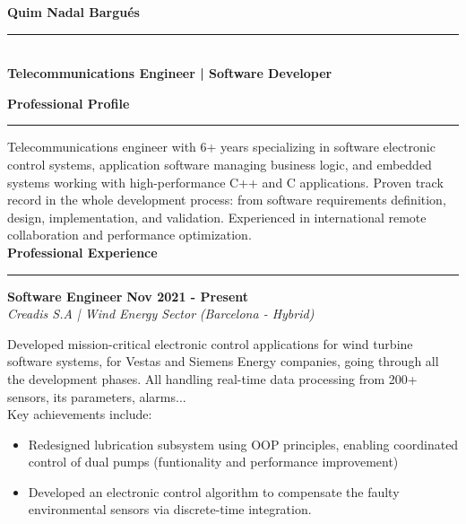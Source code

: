\documentclass[11pt,a4paper]{article}
\newcommand{\cvsection}[1]{
    \vspace{0.5em}
    \noindent\textbf{\large #1}
    \vspace{0.5em}
    \hrule\vspace{0.5em}
}
\begin{document}
\hfill
\begin{minipage}[t]{0.68\textwidth} %
    \vspace*{-26\baselineskip} %
    \nointerlineskip
    \begin{flushleft}
        {\fontsize{22}{0}\selectfont\bfseries Quim Nadal Bargués} \\ %
        \vspace{-8pt} %
        \rule{\linewidth}{0.5pt} \\
        \vspace{4pt}
        {\large\bfseries Telecommunications Engineer | Software Developer}
    \end{flushleft}
    
    \cvsection{Professional Profile}
    Telecommunications engineer with 6+ years specializing in software electronic control systems, application software managing business logic, and embedded systems working with high-performance C++ and C applications. Proven track record in the whole development process: from software requirements definition, design, implementation, and validation.
    Experienced in international remote collaboration and performance optimization. \\
    
   
    \cvsection{Professional Experience}
    
    \noindent
    \textbf{Software Engineer} \hfill \textbf{Nov 2021 - Present} \\
    \textit{Creadis S.A | Wind Energy Sector} \hfill \textit{(Barcelona - Hybrid)} \vspace{4pt}
    
    Developed mission-critical electronic control applications for wind turbine software systems, for Vestas and Siemens Energy companies, going through all the development phases. All handling real-time data processing from 200+ sensors, its parameters, alarms... \\
    Key achievements include:
    \begin{itemize}[leftmargin=*,topsep=2pt,itemsep=-1pt]
        \item Redesigned lubrication subsystem using OOP principles, enabling coordinated control of dual pumps (funtionality and performance improvement)
        \item Developed an electronic control algorithm to compensate the faulty environmental sensors via discrete-time integration.
    \end{itemize}
    

\end{minipage}
\end{document}
